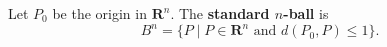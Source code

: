Let $P_0$ be the origin in $\mathbf{R}^n$. The \textbf{standard $n$-ball} is
$$B^n = \{ P \mid P \in \mathbf{R}^n \text{ and } d(P_0, P) \leq 1 \}.$$
